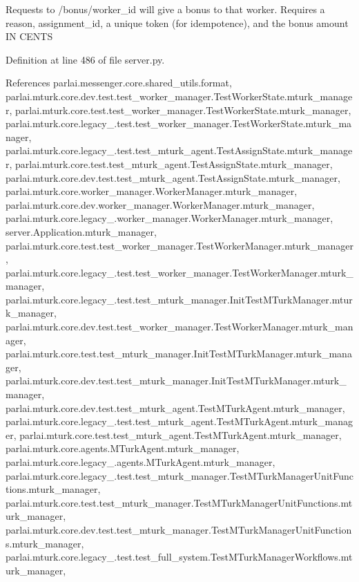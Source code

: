 \begin{DoxyVerb}Requests to /bonus/{worker_id} will give a bonus to that worker.
Requires a reason, assignment_id, a unique token (for idempotence),
and the bonus amount IN CENTS
\end{DoxyVerb}
 

Definition at line 486 of file server.\+py.



References parlai.\+messenger.\+core.\+shared\+\_\+utils.\+format, parlai.\+mturk.\+core.\+dev.\+test.\+test\+\_\+worker\+\_\+manager.\+Test\+Worker\+State.\+mturk\+\_\+manager, parlai.\+mturk.\+core.\+test.\+test\+\_\+worker\+\_\+manager.\+Test\+Worker\+State.\+mturk\+\_\+manager, parlai.\+mturk.\+core.\+legacy\+\_.\+test.\+test\+\_\+worker\+\_\+manager.\+Test\+Worker\+State.\+mturk\+\_\+manager, parlai.\+mturk.\+core.\+legacy\+\_.\+test.\+test\+\_\+mturk\+\_\+agent.\+Test\+Assign\+State.\+mturk\+\_\+manager, parlai.\+mturk.\+core.\+test.\+test\+\_\+mturk\+\_\+agent.\+Test\+Assign\+State.\+mturk\+\_\+manager, parlai.\+mturk.\+core.\+dev.\+test.\+test\+\_\+mturk\+\_\+agent.\+Test\+Assign\+State.\+mturk\+\_\+manager, parlai.\+mturk.\+core.\+worker\+\_\+manager.\+Worker\+Manager.\+mturk\+\_\+manager, parlai.\+mturk.\+core.\+dev.\+worker\+\_\+manager.\+Worker\+Manager.\+mturk\+\_\+manager, parlai.\+mturk.\+core.\+legacy\+\_.\+worker\+\_\+manager.\+Worker\+Manager.\+mturk\+\_\+manager, server.\+Application.\+mturk\+\_\+manager, parlai.\+mturk.\+core.\+test.\+test\+\_\+worker\+\_\+manager.\+Test\+Worker\+Manager.\+mturk\+\_\+manager, parlai.\+mturk.\+core.\+legacy\+\_.\+test.\+test\+\_\+worker\+\_\+manager.\+Test\+Worker\+Manager.\+mturk\+\_\+manager, parlai.\+mturk.\+core.\+legacy\+\_.\+test.\+test\+\_\+mturk\+\_\+manager.\+Init\+Test\+M\+Turk\+Manager.\+mturk\+\_\+manager, parlai.\+mturk.\+core.\+dev.\+test.\+test\+\_\+worker\+\_\+manager.\+Test\+Worker\+Manager.\+mturk\+\_\+manager, parlai.\+mturk.\+core.\+test.\+test\+\_\+mturk\+\_\+manager.\+Init\+Test\+M\+Turk\+Manager.\+mturk\+\_\+manager, parlai.\+mturk.\+core.\+dev.\+test.\+test\+\_\+mturk\+\_\+manager.\+Init\+Test\+M\+Turk\+Manager.\+mturk\+\_\+manager, parlai.\+mturk.\+core.\+dev.\+test.\+test\+\_\+mturk\+\_\+agent.\+Test\+M\+Turk\+Agent.\+mturk\+\_\+manager, parlai.\+mturk.\+core.\+legacy\+\_.\+test.\+test\+\_\+mturk\+\_\+agent.\+Test\+M\+Turk\+Agent.\+mturk\+\_\+manager, parlai.\+mturk.\+core.\+test.\+test\+\_\+mturk\+\_\+agent.\+Test\+M\+Turk\+Agent.\+mturk\+\_\+manager, parlai.\+mturk.\+core.\+agents.\+M\+Turk\+Agent.\+mturk\+\_\+manager, parlai.\+mturk.\+core.\+legacy\+\_.\+agents.\+M\+Turk\+Agent.\+mturk\+\_\+manager, parlai.\+mturk.\+core.\+legacy\+\_.\+test.\+test\+\_\+mturk\+\_\+manager.\+Test\+M\+Turk\+Manager\+Unit\+Functions.\+mturk\+\_\+manager, parlai.\+mturk.\+core.\+test.\+test\+\_\+mturk\+\_\+manager.\+Test\+M\+Turk\+Manager\+Unit\+Functions.\+mturk\+\_\+manager, parlai.\+mturk.\+core.\+dev.\+test.\+test\+\_\+mturk\+\_\+manager.\+Test\+M\+Turk\+Manager\+Unit\+Functions.\+mturk\+\_\+manager, parlai.\+mturk.\+core.\+legacy\+\_.\+test.\+test\+\_\+full\+\_\+system.\+Test\+M\+Turk\+Manager\+Workflows.\+mturk\+\_\+manager, 